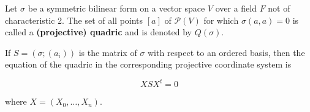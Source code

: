 Let $\sigma$ be a symmetric bilinear form on a vector space $V$ over a field $F$ not of characteristic 2. The set of all points $[a]$ of $\mathcal{P}(V)$ for which $\sigma(a, a) = 0$ is called a \textbf{(projective) quadric} and is denoted by $Q(\sigma)$.

If $S = (\sigma; (a_i))$ is the matrix of $\sigma$ with respect to an ordered basis, then the equation of the quadric in the corresponding projective coordinate system is

$$X S X^t = 0$$

where $X = (X_0, \ldots, X_n)$.
